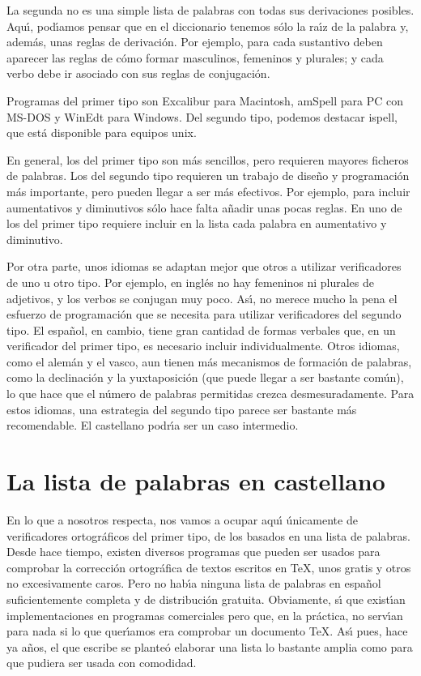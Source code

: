 \documentclass[a4paper,12pt]{article}
\begin{document}
La segunda no es una simple lista de palabras con todas sus derivaciones
posibles. Aqu\'{\i}, pod\'{\i}amos pensar que en el diccionario tenemos s\'olo
la ra\'{\i}z de la palabra y, adem\'as, unas reglas de derivaci\'on. Por ejemplo,
para cada sustantivo deben aparecer las reglas de c\'omo formar masculinos,
femeninos y plurales; y cada verbo debe ir asociado con sus reglas de
conjugaci\'on.

Programas del primer tipo son Excalibur para Macintosh, amSpell para PC con
MS-DOS y WinEdt para Windows. Del segundo tipo, podemos destacar ispell, que
est\'a disponible para equipos unix.

En general, los del primer tipo son m\'as sencillos, pero requieren mayores
ficheros de palabras. Los del segundo tipo requieren un trabajo de dise\~no y
programaci\'on m\'as importante, pero pueden llegar a ser m\'as
efectivos. Por ejemplo, para incluir aumentativos y diminutivos s\'olo hace
falta a\~nadir unas pocas reglas. En uno de los del primer tipo requiere
incluir en la lista cada palabra en aumentativo y diminutivo.

Por otra parte, unos idiomas se adaptan mejor que otros a utilizar verificadores
de uno u otro tipo. Por ejemplo, en ingl\'es no hay femeninos ni plurales de
adjetivos, y los verbos se conjugan muy poco. As\'{\i}, no merece mucho la pena
el esfuerzo de programaci\'on que se necesita para utilizar verificadores del
segundo tipo. El espa\~nol, en cambio, tiene gran cantidad de formas verbales
que, en un verificador del primer tipo, es necesario incluir individualmente.
Otros idiomas, como el alem\'an y el vasco, aun tienen m\'as mecanismos de
formaci\'on de palabras, como la declinaci\'on y la yuxtaposici\'on
(que puede llegar a ser bastante com\'un), lo que hace que el n\'umero de
palabras permitidas crezca desmesuradamente. Para estos idiomas, una estrategia
del segundo tipo parece ser bastante m\'as recomendable. El castellano
podr\'{\i}a ser un caso intermedio.

\section{La lista de palabras en castellano}

En lo que a nosotros respecta, nos vamos a ocupar aqu\'{\i} \'unicamente de
verificadores ortogr\'aficos del primer tipo, de los basados en una lista de
palabras. Desde hace tiempo, existen diversos programas que pueden ser usados
para comprobar la correcci\'on ortogr\'afica de textos escritos en \TeX, unos
gratis y otros no excesivamente caros. Pero no hab\'{\i}a ninguna lista de
palabras en espa\~nol suficientemente completa y de distribuci\'on gratuita.
Obviamente, s\'{\i} que exist\'{\i}an implementaciones en programas comerciales
pero que, en la pr\'actica, no serv\'{\i}an para nada si lo que quer\'{\i}amos
era comprobar un documento \TeX. As\'{\i} pues, hace ya a\~nos, el que escribe
se plante\'o elaborar una lista lo bastante amplia como para que pudiera ser
usada con comodidad.
\end{document}
